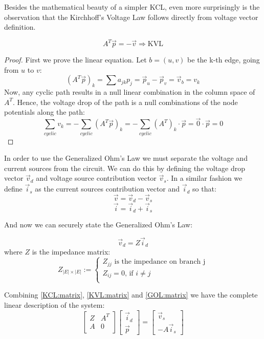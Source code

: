 \documentclass{comjnl}
\begin{document}
Besides the mathematical beauty of a simpler KCL, even more surprisingly is the observation that the Kirchhoff's Voltage Law follows directly from voltage vector definition.

\begin{theorem}[KVL]
\label{KVL:matrix}
$$ A^T\vec{p}=-\vec{v} \Rightarrow \mbox{KVL}  $$
\end{theorem}
\begin{proof}
First we prove the linear equation. Let $b=(u,v)$ be the k-th edge, going from $u$ to $v$:
$$(A^T\vec{p})_k = \sum a_{jk}p_j = \vec{p}_u - \vec{p}_v = \vec{v}_b = v_k$$
Now, any cyclic path results in a null linear combination in the column space of $A^T$. Hence, the voltage drop of the path is a null combinations of the node potentials along the path:
$$ \sum_{cyclic}v_k = - \sum_{cyclic} (A^T\vec{p})_k  = - \sum_{cyclic} (A^T)_k \cdot \vec{p} = \vec{0} \cdot \vec{p} = 0$$
\end{proof}

In order to use the Generalized Ohm's Law we must separate the voltage and current sources from the circuit. We can do this by defining the voltage drop vector $\vec{v}_{d}$ and voltage source contribution vector $\vec{v}_{s}$. In a similar fashion we define $\vec{i}_{s}$ as the current sources contribution vector and $\vec{i}_{d}$ so that:
$$ \vec{v} = \vec{v}_{d} - \vec{v}_{s}$$
$$ \vec{i} = \vec{i}_{d} +  \vec{i}_{s}$$

And now we can securely state the Generalized Ohm's Law:
\begin{theorem}[GOL]
\label{GOL:matrix}
$$ \vec{v}_{d} = Z \vec{i}_{d} $$
where $Z$ is the impedance matrix:
$$ Z_{|E|\times|E|} :=
\begin{cases} 
Z_{jj} \mbox{ is the impedance on branch j}\\
Z_{ij}=0 \mbox{, if } i\neq j \\
\end{cases}$$
\end{theorem}
Combining \ref{KCL:matrix}, \ref{KVL:matrix} and \ref{GOL:matrix} we have the complete linear description of the system:
\begin{equation}
\begin{bmatrix}
	Z & A^T \\
	A & 0   \\
\end{bmatrix}
\begin{bmatrix}
	\vec{i}_d \\
	\vec{p}
\end{bmatrix}
=
\begin{bmatrix}
	\vec{v}_s \\
	-A\vec{i}_s
\end{bmatrix}
\end{equation}
\end{document}
